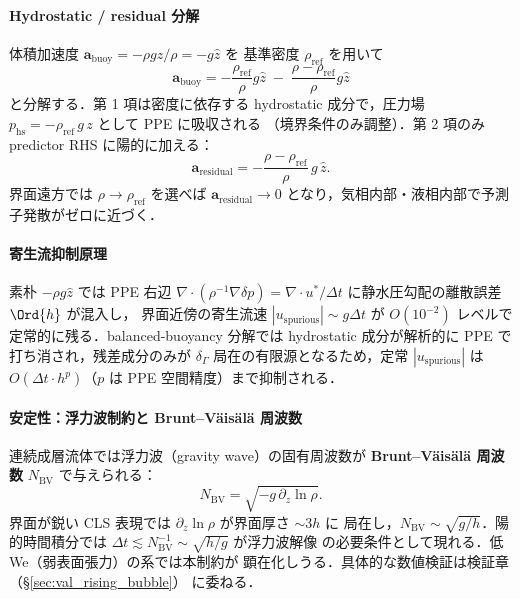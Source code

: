 \paragraph{Hydrostatic / residual 分解}
体積加速度 $\bm{a}_\text{buoy} = -\rho g \hat{z}/\rho = -g\hat{z}$ を
基準密度 $\rho_\text{ref}$ を用いて
\begin{equation}
  \bm{a}_\text{buoy} = -\frac{\rho_\text{ref}}{\rho}g\hat{z}
                       \;-\;\frac{\rho - \rho_\text{ref}}{\rho}g\hat{z}
  \label{eq:buoy_split}
\end{equation}
と分解する．第 1 項は密度に依存する hydrostatic 成分で，圧力場
$p_\text{hs} = -\rho_\text{ref}\,g\,z$ として PPE に吸収される
（境界条件のみ調整）．第 2 項のみ predictor RHS に陽的に加える：
\begin{equation}
  \bm{a}_\text{residual} = -\frac{\rho - \rho_\text{ref}}{\rho}\,g\,\hat{z}.
  \label{eq:buoy_residual}
\end{equation}
界面遠方では $\rho \to \rho_\text{ref}$ を選べば $\bm{a}_\text{residual}\to 0$
となり，気相内部・液相内部で予測子発散がゼロに近づく．

\paragraph{寄生流抑制原理}
素朴 $-\rho g \hat{z}$ では PPE 右辺
$\nabla\!\cdot(\rho^{-1}\nabla\delta p) = \nabla\!\cdot u^{*}/\Delta t$
に静水圧勾配の離散誤差 $\Ord{h}$ が混入し，
界面近傍の寄生流速 $|u_\text{spurious}| \sim g\Delta t$ が
$O(10^{-2})$ レベルで定常的に残る．balanced-buoyancy 分解では
hydrostatic 成分が解析的に PPE で打ち消され，残差成分のみが
$\delta_\Gamma$ 局在の有限源となるため，定常 $|u_\text{spurious}|$
は $O(\Delta t \cdot h^{p})$（$p$ は PPE 空間精度）まで抑制される．

\paragraph{安定性：浮力波制約と Brunt--Väisälä 周波数}
連続成層流体では浮力波（gravity wave）の固有周波数が
\textbf{Brunt--Väisälä 周波数} $N_\text{BV}$ で与えられる：
\begin{equation}
  N_\text{BV} = \sqrt{-g\,\partial_z \ln\rho}.
  \label{eq:brunt_vaisala}
\end{equation}
界面が鋭い CLS 表現では $\partial_z\ln\rho$ が界面厚さ $\sim 3h$ に
局在し，$N_\text{BV} \sim \sqrt{g/h}$．陽的時間積分では
$\Delta t \lesssim N_\text{BV}^{-1} \sim \sqrt{h/g}$ が浮力波解像
の必要条件として現れる．低 We（弱表面張力）の系では本制約が
顕在化しうる．具体的な数値検証は検証章（\S\ref{sec:val_rising_bubble}）
に委ねる．

